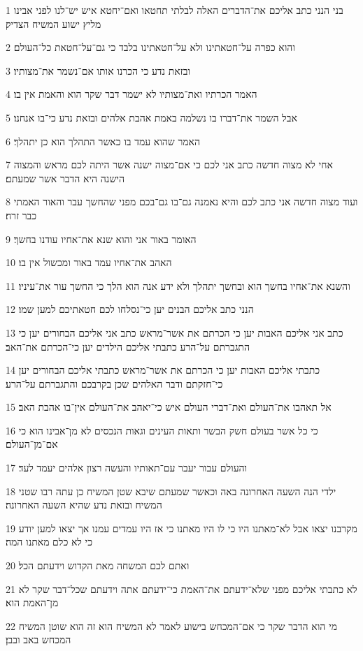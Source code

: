 \par 1 בני הנני כתב אליכם את־הדברים האלה לבלתי תחטאו ואם־יחטא איש יש־לנו לפני אבינו מליץ ישוע המשיח הצדיק׃
\par 2 והוא כפרה על־חטאתינו ולא על־חטאתינו בלבד כי גם־על־חטאת כל־העולם׃
\par 3 ובזאת נדע כי הכרנו אותו אם־נשמר את־מצותיו׃
\par 4 האמר הכרתיו ואת־מצותיו לא ישמר דבר שקר הוא והאמת אין בו׃
\par 5 אבל השמר את־דברו בו נשלמה באמת אהבת אלהים ובזאת נדע כי־בו אנחנו׃
\par 6 האמר שהוא עמד בו כאשר התהלך הוא כן יתהלך׃
\par 7 אחי לא מצוה חדשה כתב אני לכם כי אם־מצוה ישנה אשר היתה לכם מראש והמצוה הישנה היא הדבר אשר שמעתם׃
\par 8 ועוד מצוה חדשה אני כתב לכם והיא נאמנה גם־בו גם־בכם מפני שהחשך עבר והאור האמתי כבר זרח׃
\par 9 האומר באור אני והוא שנא את־אחיו עודנו בחשך׃
\par 10 האהב את־אחיו עמד באור ומכשול אין בו׃
\par 11 והשנא את־אחיו בחשך הוא ובחשך יתהלך ולא ידע אנה הוא הלך כי החשך עור את־עיניו׃
\par 12 הנני כתב אליכם הבנים יען כי־נסלחו לכם חטאתיכם למען שמו׃
\par 13 כתב אני אליכם האבות יען כי הכרתם את אשר־מראש כתב אני אליכם הבחורים יען כי התגברתם על־הרע כתבתי אליכם הילדים יען כי־הכרתם את־האב׃
\par 14 כתבתי אליכם האבות יען כי הכרתם את אשר־מראש כתבתי אליכם הבחורים יען כי־חזקתם ודבר האלהים שכן בקרבכם והתגברתם על־הרע׃
\par 15 אל תאהבו את־העולם ואת־דברי העולם איש כי־יאהב את־העולם אין־בו אהבת האב׃
\par 16 כי כל אשר בעולם חשק הבשר ותאות העינים וגאות הנכסים לא מן־אבינו הוא כי אם־מן־העולם׃
\par 17 והעולם עבור יעבר עם־תאותיו והעשה רצון אלהים יעמד לעד׃
\par 18 ילדי הנה השעה האחרונה באה וכאשר שמעתם שיבא שטן המשיח כן עתה רבו שטני המשיח ובזאת נדע שהיא השעה האחרונה׃
\par 19 מקרבנו יצאו אבל לא־מאתנו היו כי לו היו מאתנו כי אז היו עמדים עמנו אך יצאו למען יודע כי לא כלם מאתנו המה׃
\par 20 ואתם לכם המשחה מאת הקדוש וידעתם הכל׃
\par 21 לא כתבתי אליכם מפני שלא־ידעתם את־האמת כי־ידעתם אתה וידעתם שכל־דבר שקר לא מן־האמת הוא׃
\par 22 מי הוא הדבר שקר כי אם־המכחש בישוע לאמר לא המשיח הוא זה הוא שוטן המשיח המכחש באב ובבן׃
